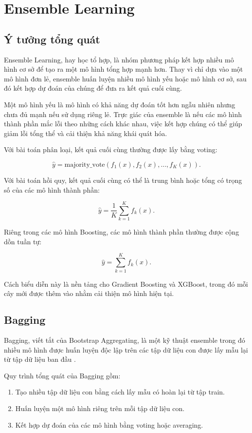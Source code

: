 \section{Ensemble Learning}

\subsection{Ý tưởng tổng quát}

Ensemble Learning, hay học tổ hợp, là nhóm phương pháp kết hợp nhiều mô hình cơ sở để tạo ra một mô hình tổng hợp mạnh hơn. Thay vì chỉ dựa vào một mô hình đơn lẻ, ensemble huấn luyện nhiều mô hình yếu hoặc mô hình cơ sở, sau đó kết hợp dự đoán của chúng để đưa ra kết quả cuối cùng.

Một mô hình yếu là mô hình có khả năng dự đoán tốt hơn ngẫu nhiên nhưng chưa đủ mạnh nếu sử dụng riêng lẻ. Trực giác của ensemble là nếu các mô hình thành phần mắc lỗi theo những cách khác nhau, việc kết hợp chúng có thể giúp giảm lỗi tổng thể và cải thiện khả năng khái quát hóa.

Với bài toán phân loại, kết quả cuối cùng thường được lấy bằng voting:

\[
\hat{y} = \mathrm{majority\_vote}(f_1(x), f_2(x), \ldots, f_K(x)).
\]

Với bài toán hồi quy, kết quả cuối cùng có thể là trung bình hoặc tổng có trọng số của các mô hình thành phần:

\[
\hat{y} = \frac{1}{K}\sum_{k=1}^{K} f_k(x).
\]

Riêng trong các mô hình Boosting, các mô hình thành phần thường được cộng dồn tuần tự:

\[
\hat{y} = \sum_{k=1}^{K} f_k(x).
\]

Cách biểu diễn này là nền tảng cho Gradient Boosting và XGBoost, trong đó mỗi cây mới được thêm vào nhằm cải thiện mô hình hiện tại.

\subsection{Bagging}

Bagging, viết tắt của Bootstrap Aggregating, là một kỹ thuật ensemble trong đó nhiều mô hình được huấn luyện độc lập trên các tập dữ liệu con được lấy mẫu lại từ tập dữ liệu ban đầu \cite{breiman1996bagging}.

Quy trình tổng quát của Bagging gồm:

\begin{enumerate}
    \item Tạo nhiều tập dữ liệu con bằng cách lấy mẫu có hoàn lại từ tập train.
    \item Huấn luyện một mô hình riêng trên mỗi tập dữ liệu con.
    \item Kết hợp dự đoán của các mô hình bằng voting hoặc averaging.
\end{enumerate}

